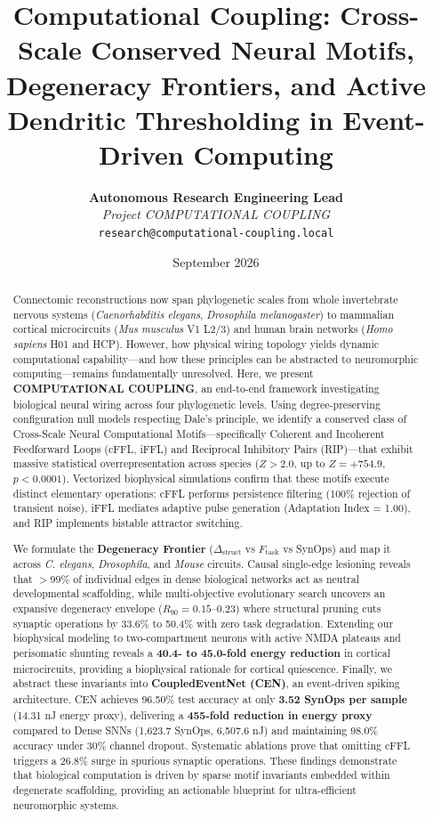 \documentclass[10pt,twocolumn,letterpaper]{article}
\title{\textbf{Computational Coupling: Cross-Scale Conserved Neural Motifs, Degeneracy Frontiers, and Active Dendritic Thresholding in Event-Driven Computing}}
\author{
  \textbf{Autonomous Research Engineering Lead}\\
  \textit{Project COMPUTATIONAL COUPLING}\\
  \texttt{research@computational-coupling.local}
}
\date{September 2026}
\begin{document}
\maketitle

\begin{abstract}
Connectomic reconstructions now span phylogenetic scales from whole invertebrate nervous systems (\textit{Caenorhabditis elegans}, \textit{Drosophila melanogaster}) to mammalian cortical microcircuits (\textit{Mus musculus} V1 L2/3) and human brain networks (\textit{Homo sapiens} H01 and HCP). However, how physical wiring topology yields dynamic computational capability---and how these principles can be abstracted to neuromorphic computing---remains fundamentally unresolved. Here, we present \textbf{COMPUTATIONAL COUPLING}, an end-to-end framework investigating biological neural wiring across four phylogenetic levels. Using degree-preserving configuration null models respecting Dale's principle, we identify a conserved class of Cross-Scale Neural Computational Motifs---specifically Coherent and Incoherent Feedforward Loops (cFFL, iFFL) and Reciprocal Inhibitory Pairs (RIP)---that exhibit massive statistical overrepresentation across species ($Z > 2.0$, up to $Z = +754.9$, $p < 0.0001$). Vectorized biophysical simulations confirm that these motifs execute distinct elementary operations: cFFL performs persistence filtering (100\% rejection of transient noise), iFFL mediates adaptive pulse generation (Adaptation Index = 1.00), and RIP implements bistable attractor switching.

We formulate the \textbf{Degeneracy Frontier} ($\Delta_{\mathrm{struct}}$ vs $F_{\mathrm{task}}$ vs SynOps) and map it across \textit{C. elegans}, \textit{Drosophila}, and \textit{Mouse} circuits. Causal single-edge lesioning reveals that $>99\%$ of individual edges in dense biological networks act as neutral developmental scaffolding, while multi-objective evolutionary search uncovers an expansive degeneracy envelope ($R_{90} = 0.15\text{--}0.23$) where structural pruning cuts synaptic operations by 33.6\% to 50.4\% with zero task degradation. Extending our biophysical modeling to two-compartment neurons with active NMDA plateaus and perisomatic shunting reveals a \textbf{40.4- to 45.0-fold energy reduction} in cortical microcircuits, providing a biophysical rationale for cortical quiescence. Finally, we abstract these invariants into \textbf{CoupledEventNet (CEN)}, an event-driven spiking architecture. CEN achieves 96.50\% test accuracy at only \textbf{3.52 SynOps per sample} (14.31 nJ energy proxy), delivering a \textbf{455-fold reduction in energy proxy} compared to Dense SNNs (1,623.7 SynOps, 6,507.6 nJ) and maintaining 98.0\% accuracy under 30\% channel dropout. Systematic ablations prove that omitting cFFL triggers a 26.8\% surge in spurious synaptic operations. These findings demonstrate that biological computation is driven by sparse motif invariants embedded within degenerate scaffolding, providing an actionable blueprint for ultra-efficient neuromorphic systems.
\end{abstract}
\end{document}
